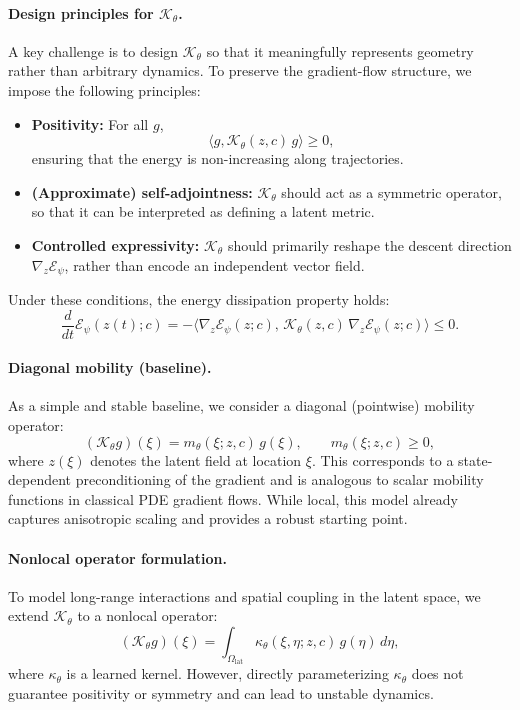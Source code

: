 \documentclass[11pt]{article}
\begin{document}
\paragraph{Design principles for $\mathcal K_\theta$.}
A key challenge is to design $\mathcal K_\theta$ so that it meaningfully represents geometry rather than arbitrary dynamics. 
To preserve the gradient-flow structure, we impose the following principles:
\begin{itemize}
\item[(i)] \textbf{Positivity:} For all $g$,
\[
\langle g, \mathcal K_\theta(z,c)\, g \rangle \ge 0,
\]
ensuring that the energy is non-increasing along trajectories.

\item[(ii)] \textbf{(Approximate) self-adjointness:} $\mathcal K_\theta$ should act as a symmetric operator, so that it can be interpreted as defining a latent metric.

\item[(iii)] \textbf{Controlled expressivity:} $\mathcal K_\theta$ should primarily reshape the descent direction $\nabla_z \mathcal E_\psi$, rather than encode an independent vector field.
\end{itemize}

Under these conditions, the energy dissipation property holds:
\begin{equation}
\frac{d}{dt}\mathcal E_\psi(z(t);c)
=
- \big\langle \nabla_z \mathcal E_\psi(z;c),\, \mathcal K_\theta(z,c)\,\nabla_z \mathcal E_\psi(z;c)\big\rangle \le 0.
\end{equation}

\paragraph{Diagonal mobility (baseline).}
As a simple and stable baseline, we consider a diagonal (pointwise) mobility operator:
\begin{equation}
(\mathcal K_\theta g)(\xi)
=
m_\theta(\xi;z,c)\, g(\xi),
\qquad m_\theta(\xi;z,c)\ge 0,
\label{eq:diag_mobility_full}
\end{equation}
where $z(\xi)$ denotes the latent field at location $\xi$. 
This corresponds to a state-dependent preconditioning of the gradient and is analogous to scalar mobility functions in classical PDE gradient flows. 
While local, this model already captures anisotropic scaling and provides a robust starting point.

\paragraph{Nonlocal operator formulation.}
To model long-range interactions and spatial coupling in the latent space, we extend $\mathcal K_\theta$ to a nonlocal operator:
\begin{equation}
(\mathcal K_\theta g)(\xi)
=
\int_{\Omega_{\mathrm{lat}}}
\kappa_\theta(\xi,\eta;z,c)\, g(\eta)\, d\eta,
\label{eq:integral_operator_full}
\end{equation}
where $\kappa_\theta$ is a learned kernel. 
However, directly parameterizing $\kappa_\theta$ does not guarantee positivity or symmetry and can lead to unstable dynamics.
\end{document}
